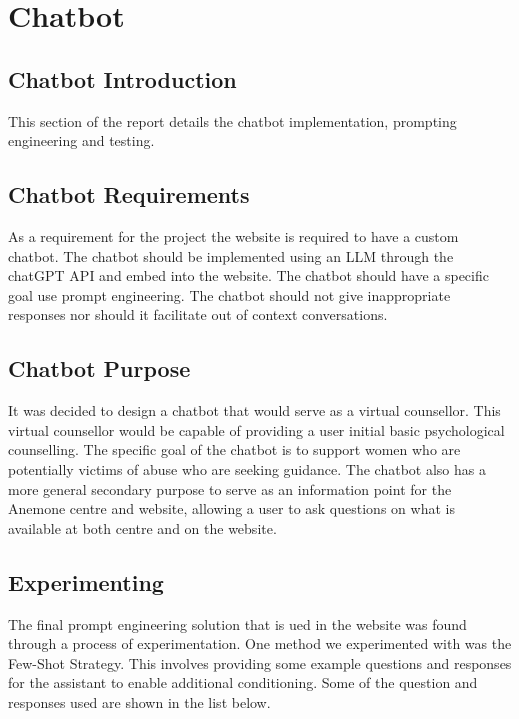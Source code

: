 \section{Chatbot}
\subsection{Chatbot Introduction}

This section of the report details the chatbot implementation, prompting engineering and testing. 

\subsection{Chatbot Requirements}
As a requirement for the project the website is required to have a custom chatbot. 
The chatbot should be implemented using an LLM through the chatGPT API and embed into the website. 
The chatbot should have a specific goal use prompt engineering. 
The chatbot should not give inappropriate responses nor should it facilitate out of context conversations.

\subsection{Chatbot Purpose}
It was decided to design a chatbot that would serve as a virtual counsellor. 
This virtual counsellor would be capable of providing a user initial basic psychological counselling.
The specific goal of the chatbot is to support women who are potentially victims of abuse who are seeking guidance. 
The chatbot also has a more general secondary purpose to serve as an information point for the Anemone centre and website, 
allowing a user to ask questions on what is available at both centre and on the website. 

\subsection{Experimenting}

The final prompt engineering solution that is ued in the website was found through a process of experimentation. One method we experimented with was the Few-Shot Strategy. This involves providing some example questions and responses for the assistant to enable additional conditioning. 
Some of the question and responses used are shown in the list below. 

